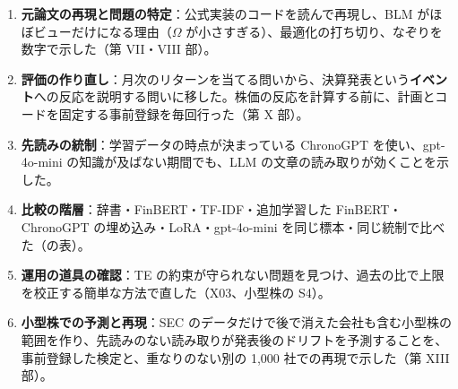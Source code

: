 \begin{enumerate}
\item \textbf{元論文の再現と問題の特定}：公式実装のコードを読んで再現し、BLM がほぼビューだけになる理由（$\Omega$ が小さすぎる）、最適化の打ち切り、なぞりを数字で示した（第 VII・VIII 部）。
\item \textbf{評価の作り直し}：月次のリターンを当てる問いから、決算発表という\textbf{イベント}への反応を説明する問いに移した。株価の反応を計算する前に、計画とコードを固定する事前登録を毎回行った（第 X 部）。
\item \textbf{先読みの統制}：学習データの時点が決まっている ChronoGPT を使い、gpt-4o-mini の知識が及ばない期間でも、LLM の文章の読み取りが効くことを示した。
\item \textbf{比較の階層}：辞書・FinBERT・TF-IDF・追加学習した FinBERT・ChronoGPT の埋め込み・LoRA・gpt-4o-mini を同じ標本・同じ統制で比べた（の表）。
\item \textbf{運用の道具の確認}：TE の約束が守られない問題を見つけ、過去の比で上限を校正する簡単な方法で直した（X03、小型株の S4）。
\item \textbf{小型株での予測と再現}：SEC のデータだけで後で消えた会社も含む小型株の範囲を作り、先読みのない読み取りが発表後のドリフトを予測することを、事前登録した検定と、重なりのない別の 1,000 社での再現で示した（第 XIII 部）。
\end{enumerate}
